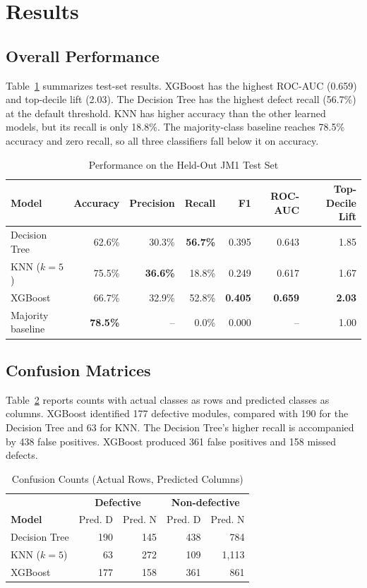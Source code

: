 \documentclass[conference]{IEEEtran}
\begin{document}
\section{Results}
\subsection{Overall Performance}
Table~\ref{tab:metrics} summarizes test-set results. XGBoost has the highest ROC-AUC (0.659) and top-decile lift (2.03). The Decision Tree has the highest defect recall (56.7\%) at the default threshold. KNN has higher accuracy than the other learned models, but its recall is only 18.8\%. The majority-class baseline reaches 78.5\% accuracy and zero recall, so all three classifiers fall below it on accuracy.

\begin{table}[t]
\caption{Performance on the Held-Out JM1 Test Set}
\label{tab:metrics}
\centering
\footnotesize
\begin{tabular}{lrrrrrr}
\toprule
\textbf{Model} & \textbf{Accuracy} & \textbf{Precision} & \textbf{Recall} & \textbf{F1} & \textbf{ROC-AUC} & \textbf{Top-Decile Lift}\\
\midrule
Decision Tree & 62.6\% & 30.3\% & \textbf{56.7\%} & 0.395 & 0.643 & 1.85\\
KNN ($k=5$) & 75.5\% & \textbf{36.6\%} & 18.8\% & 0.249 & 0.617 & 1.67\\
XGBoost & 66.7\% & 32.9\% & 52.8\% & \textbf{0.405} & \textbf{0.659} & \textbf{2.03}\\
Majority baseline & \textbf{78.5\%} & -- & 0.0\% & 0.000 & -- & 1.00\\
\bottomrule
\end{tabular}
\end{table}

\subsection{Confusion Matrices}
Table~\ref{tab:confusion} reports counts with actual classes as rows and predicted classes as columns. XGBoost identified 177 defective modules, compared with 190 for the Decision Tree and 63 for KNN. The Decision Tree's higher recall is accompanied by 438 false positives. XGBoost produced 361 false positives and 158 missed defects.

\begin{table}[t]
\caption{Confusion Counts (Actual Rows, Predicted Columns)}
\label{tab:confusion}
\centering
\footnotesize
\begin{tabular}{lrrrr}
\toprule
& \multicolumn{2}{c}{\textbf{Defective}} & \multicolumn{2}{c}{\textbf{Non-defective}}\\
\textbf{Model} & Pred. D & Pred. N & Pred. D & Pred. N\\
\midrule
Decision Tree & 190 & 145 & 438 & 784\\
KNN ($k=5$) & 63 & 272 & 109 & 1,113\\
XGBoost & 177 & 158 & 361 & 861\\
\bottomrule
\end{tabular}
\end{table}
\end{document}
